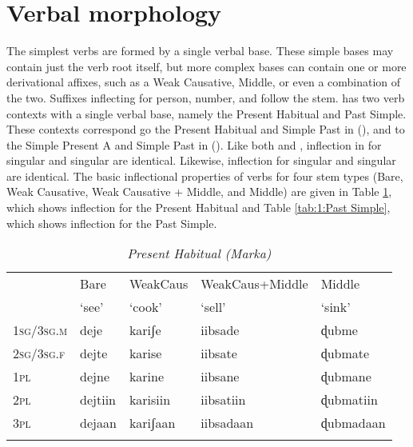 \documentclass[output=paper]{LSP/langsci}
\begin{document}
 \section{Verbal morphology}
 
The simplest  verbs are formed by a single verbal base. These simple bases may contain just the verb root itself, but more complex bases can contain one or more derivational affixes, such as a Weak Causative, Middle, or even a combination of the two. Suffixes inflecting for person, number, and  follow the stem.  has two verb contexts with a single verbal base, namely the Present Habitual and Past Simple. These contexts correspond go the Present Habitual and Simple Past in  (\citealt{Greenetal2015}), and to the Simple Present A and Simple Past in  (\citealt{PasterRanero2015}). Like both  and , inflection in  for  singular and   singular are identical. Likewise, inflection for  singular and   singular are identical. The basic inflectional properties of  verbs for four stem types (Bare, Weak Causative, Weak Causative + Middle, and Middle) are given in Table \ref{tab:1:Present Habitual}, which shows inflection for the Present Habitual and Table \ref{tab:1:Past Simple}, which shows inflection for the Past Simple. 
 
 \begin{table}
 	\caption{\textit{Present Habitual (Marka)}}
 	\label{tab:1:Present Habitual}
 	\begin{tabularx}{\textwidth}{Xllll} 
 		\lsptoprule
 		& Bare   & WeakCaus  & WeakCaus+Middle & Middle   \\
 		& `see' & `cook' & `sell' & `sink' \\ 
 		\midrule
 		1\textsc{sg}/3\textsc{sg.m} & deje & kariʃe & iibsade & ɖubme \\
 		2\textsc{sg}/3\textsc{sg.f} & dejte  & karise & iibsate  & ɖubmate  \\
 		1\textsc{pl} & dejne & karine & iibsane & ɖubmane \\
 		2\textsc{pl} & dejtiin & karisiin & iibsatiin & ɖubmatiin \\
 		3\textsc{pl} & dejaan & kariʃaan & iibsadaan & ɖubmadaan \\
 	
 		\lspbottomrule
 	\end{tabularx}
 \end{table}
 
\end{document}
